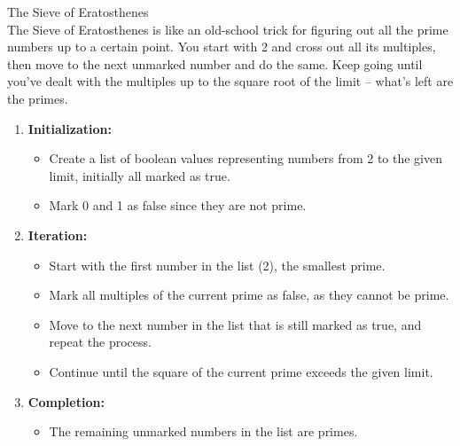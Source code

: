 \begin{exmp}{The Sieve of Eratosthenes}$ $\\

The Sieve of Eratosthenes is like an old-school trick for figuring out all the prime numbers up to a certain point. You start with 2 and cross out all its multiples, then move to the next unmarked number and do the same. Keep going until you've dealt with the multiples up to the square root of the limit – what's left are the primes.
\begin{enumerate}
  \item \textbf{Initialization:}
    \begin{itemize}
      \item Create a list of boolean values representing numbers from 2 to the given limit, initially all marked as true.
      \item Mark 0 and 1 as false since they are not prime.
    \end{itemize}
  
  \item \textbf{Iteration:}
    \begin{itemize}
      \item Start with the first number in the list (2), the smallest prime.
      \item Mark all multiples of the current prime as false, as they cannot be prime.
      \item Move to the next number in the list that is still marked as true, and repeat the process.
      \item Continue until the square of the current prime exceeds the given limit.
    \end{itemize}
  
  \item \textbf{Completion:}
    \begin{itemize}
      \item The remaining unmarked numbers in the list are primes.
    \end{itemize}
  

\end{enumerate}
\end{exmp}
